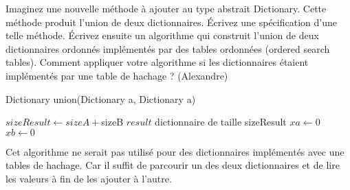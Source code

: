 \newpage
Imaginez une nouvelle méthode à ajouter au type abstrait Dictionary. Cette méthode produit l’union de deux dictionnaires. Écrivez une spécification d’une telle méthode. Écrivez ensuite un algorithme qui construit l’union de deux dictionnaires ordonnés implémentés par des tables ordonnées (ordered search tables). Comment appliquer votre algorithme si les dictionnaires étaient implémentés par une table de hachage ? (Alexandre)

\begin{algorithm}
Dictionary union(Dictionary a, Dictionary a)
\end{algorithm}

\begin{algorithm}
\BlankLine
$sizeResult \longleftarrow sizeA + $sizeB\;
$result$ dictionnaire de taille sizeResult\;
$xa \gets 0$\;
$xb \gets 0$\;
\end{algorithm}

Cet algorithme ne serait pas utilisé pour des dictionnaires implémentés avec une tables de hachage. Car il suffit de parcourir un des deux dictionnaires et de lire les valeurs à fin de les ajouter à l'autre.
